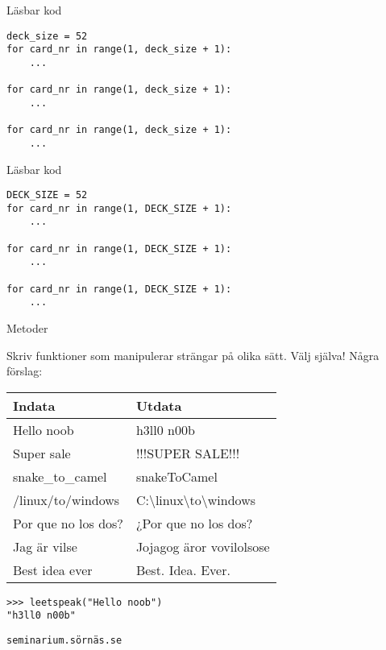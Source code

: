 \documentclass{beamer}
\begin{document}
  \begin{frame}[fragile]{Läsbar kod}

    \begin{verbatim}
deck_size = 52
for card_nr in range(1, deck_size + 1):
    ...

for card_nr in range(1, deck_size + 1):
    ...

for card_nr in range(1, deck_size + 1):
    ...
    \end{verbatim}

  \end{frame}

  \begin{frame}[fragile]{Läsbar kod}

    \begin{verbatim}
DECK_SIZE = 52
for card_nr in range(1, DECK_SIZE + 1):
    ...

for card_nr in range(1, DECK_SIZE + 1):
    ...

for card_nr in range(1, DECK_SIZE + 1):
    ...
    \end{verbatim}

  \end{frame}

  \begin{frame}[fragile]{Metoder}

    Skriv funktioner som manipulerar strängar på olika sätt. Välj själva! \pause{}Några
    förslag:

    {
      \ttfamily
      \small
      \begin{tabular}{l l}
        Indata & Utdata \\\toprule
        Hello noob & h3ll0 n00b \\
        Super sale & !!!SUPER SALE!!! \\
        snake\_to\_camel & snakeToCamel \\
        /linux/to/windows & C:\textbackslash{}linux\textbackslash{}to\textbackslash{}windows \\
        Por que no los dos? & ¿Por que no los dos? \\
        Jag är vilse & Jojagog äror vovilolsose \\
        Best idea ever & Best. Idea. Ever. \\
      \end{tabular}
    }

    \pause{}

    \begin{verbatim}
>>> leetspeak("Hello noob")
"h3ll0 n00b"
    \end{verbatim}

    \vspace{-1em}

    \texttt{seminarium.sörnäs.se}

  \end{frame}
\end{document}
